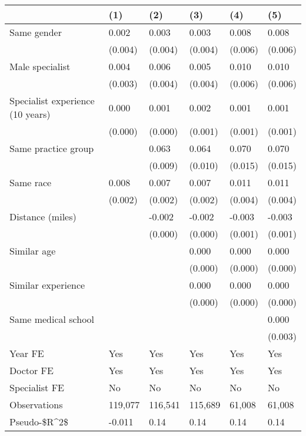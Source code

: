 \begin{tabular}{llllll}
\hline
& (1) & (2) & (3) & (4) & (5) \\ \hline
Same gender                        & 0.002   & 0.003   & 0.003   & 0.008   & 0.008   \\
& (0.004) & (0.004) & (0.004) & (0.006) & (0.006) \\
Male specialist                    & 0.004   & 0.006   & 0.005   & 0.010   & 0.010   \\
& (0.003) & (0.004) & (0.004) & (0.006) & (0.006) \\
Specialist experience (10 years)   & 0.000   & 0.001   & 0.002   & 0.001   & 0.001   \\
& (0.000) & (0.000) & (0.001) & (0.001) & (0.001) \\
Same practice group                &         & 0.063   & 0.064   & 0.070   & 0.070   \\
&         & (0.009) & (0.010) & (0.015) & (0.015) \\
Same race                          & 0.008   & 0.007   & 0.007   & 0.011   & 0.011   \\
& (0.002) & (0.002) & (0.002) & (0.004) & (0.004) \\
Distance (miles)                   &         & -0.002  & -0.002  & -0.003  & -0.003  \\
&         & (0.000) & (0.000) & (0.001) & (0.001) \\
Similar age                        &         &         & 0.000   & 0.000   & 0.000   \\
&         &         & (0.000) & (0.000) & (0.000) \\
Similar experience                 &         &         & 0.000   & 0.000   & 0.000   \\
&         &         & (0.000) & (0.000) & (0.000) \\
Same medical school                &         &         &         &         & 0.000   \\
&         &         &         &         & (0.003) \\
Year FE                            & Yes     & Yes     & Yes     & Yes     & Yes     \\
Doctor FE                          & Yes     & Yes     & Yes     & Yes     & Yes     \\
Specialist FE                      & No      & No      & No      & No      & No      \\
Observations                       & 119,077 & 116,541 & 115,689 & 61,008  & 61,008  \\
Pseudo-\$R\textasciicircum{}2\$ & -0.011  & 0.14    & 0.14    & 0.14    & 0.14    \\
\hline
\end{tabular}
